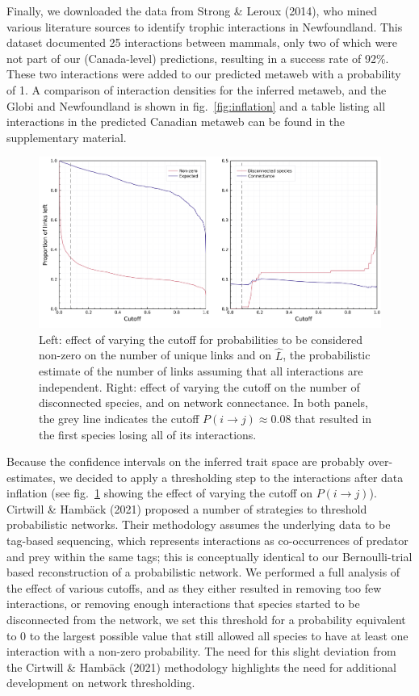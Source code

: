 \documentclass[10pt,oneside]{article}
\makeatletter
\def\maxwidth{\ifdim\Gin@nat@width>\linewidth\linewidth
\else\Gin@nat@width\fi}
\let\Oldincludegraphics\includegraphics
\renewcommand{\includegraphics}[1]{\Oldincludegraphics[width=\maxwidth]{#1}}
\makeatother
\begin{document}
Finally, we downloaded the data from Strong \& Leroux (2014), who mined
various literature sources to identify trophic interactions in
Newfoundland. This dataset documented 25 interactions between mammals,
only two of which were not part of our (Canada-level) predictions,
resulting in a success rate of 92\%. These two interactions were added
to our predicted metaweb with a probability of 1. A comparison of
interaction densities for the inferred metaweb, and the Globi and
Newfoundland is shown in fig.~\ref{fig:inflation} and a table listing
all interactions in the predicted Canadian metaweb can be found in the
supplementary material.

\begin{figure}
\hypertarget{fig:thresholds}{%
\centering
\includegraphics{figures/figure-cutoffs.png}
\caption{Left: effect of varying the cutoff for probabilities to be
considered non-zero on the number of unique links and on \(\hat{L}\),
the probabilistic estimate of the number of links assuming that all
interactions are independent. Right: effect of varying the cutoff on the
number of disconnected species, and on network connectance. In both
panels, the grey line indicates the cutoff
\(P(i\rightarrow j) \approx 0.08\) that resulted in the first species
losing all of its interactions.}\label{fig:thresholds}
}
\end{figure}

Because the confidence intervals on the inferred trait space are
probably over-estimates, we decided to apply a thresholding step to the
interactions after data inflation (see fig.~\ref{fig:thresholds} showing
the effect of varying the cutoff on \(P(i \rightarrow j)\)). Cirtwill \&
Hambäck (2021) proposed a number of strategies to threshold
probabilistic networks. Their methodology assumes the underlying data to
be tag-based sequencing, which represents interactions as co-occurrences
of predator and prey within the same tags; this is conceptually
identical to our Bernoulli-trial based reconstruction of a probabilistic
network. We performed a full analysis of the effect of various cutoffs,
and as they either resulted in removing too few interactions, or
removing enough interactions that species started to be disconnected
from the network, we set this threshold for a probability equivalent to
0 to the largest possible value that still allowed all species to have
at least one interaction with a non-zero probability. The need for this
slight deviation from the Cirtwill \& Hambäck (2021) methodology
highlights the need for additional development on network thresholding.
\end{document}
